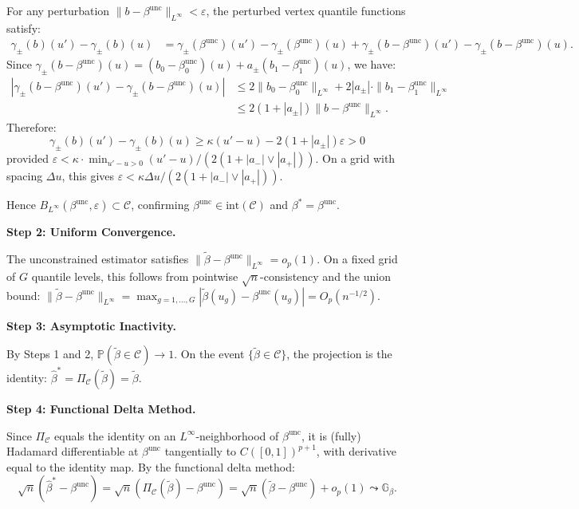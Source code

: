 \documentclass[12pt]{article}
\newcommand{\Prob}{\mathbb{P}}
\begin{document}
For any perturbation $\|b - \beta^{\text{unc}}\|_{L^\infty} < \varepsilon$, the perturbed vertex quantile functions satisfy:
\begin{align}
\gamma_\pm(b)(u') - \gamma_\pm(b)(u) &= \gamma_\pm(\beta^{\text{unc}})(u') - \gamma_\pm(\beta^{\text{unc}})(u) + \gamma_\pm(b-\beta^{\text{unc}})(u') - \gamma_\pm(b-\beta^{\text{unc}})(u).
\end{align}
Since $\gamma_\pm(b - \beta^{\text{unc}})(u) = (b_0 - \beta_0^{\text{unc}})(u) + a_\pm (b_1 - \beta_1^{\text{unc}})(u)$, we have:
\begin{align}
|\gamma_\pm(b-\beta^{\text{unc}})(u') - \gamma_\pm(b-\beta^{\text{unc}})(u)| &\leq 2\|b_0 - \beta_0^{\text{unc}}\|_{L^\infty} + 2|a_\pm| \cdot \|b_1 - \beta_1^{\text{unc}}\|_{L^\infty} \\
&\leq 2(1 + |a_\pm|) \|b - \beta^{\text{unc}}\|_{L^\infty}.
\end{align}
Therefore:
\[
\gamma_\pm(b)(u') - \gamma_\pm(b)(u) \geq \kappa(u'-u) - 2(1 + |a_\pm|)\varepsilon > 0
\]
provided $\varepsilon < \kappa \cdot \min_{u'-u > 0}(u'-u) / (2(1 + |a_-| \vee |a_+|))$. On a grid with spacing $\Delta u$, this gives $\varepsilon < \kappa \Delta u / (2(1 + |a_-| \vee |a_+|))$.

Hence $B_{L^\infty}(\beta^{\text{unc}}, \varepsilon) \subset \mathcal{C}$, confirming $\beta^{\text{unc}} \in \text{int}(\mathcal{C})$ and $\beta^* = \beta^{\text{unc}}$.

\textbf{Step 2: Uniform Convergence.}

The unconstrained estimator satisfies $\|\tilde{\beta} - \beta^{\text{unc}}\|_{L^\infty} = o_p(1)$. On a fixed grid of $G$ quantile levels, this follows from pointwise $\sqrt{n}$-consistency and the union bound: $\|\tilde{\beta} - \beta^{\text{unc}}\|_{L^\infty} = \max_{g=1,\dots,G} |\tilde{\beta}(u_g) - \beta^{\text{unc}}(u_g)| = O_p(n^{-1/2})$.

\textbf{Step 3: Asymptotic Inactivity.}

By Steps 1 and 2, $\Prob(\tilde{\beta} \in \mathcal{C}) \to 1$. On the event $\{\tilde{\beta} \in \mathcal{C}\}$, the projection is the identity: $\hat{\beta}^* = \Pi_{\mathcal{C}}(\tilde{\beta}) = \tilde{\beta}$.

\textbf{Step 4: Functional Delta Method.}

Since $\Pi_{\mathcal{C}}$ equals the identity on an $L^\infty$-neighborhood of $\beta^{\text{unc}}$, it is (fully) Hadamard differentiable at $\beta^{\text{unc}}$ tangentially to $C([0,1])^{p+1}$, with derivative equal to the identity map. By the functional delta method:
\[
\sqrt{n}(\hat{\beta}^* - \beta^{\text{unc}}) = \sqrt{n}(\Pi_{\mathcal{C}}(\tilde{\beta}) - \beta^{\text{unc}}) = \sqrt{n}(\tilde{\beta} - \beta^{\text{unc}}) + o_p(1) \leadsto \mathbb{G}_\beta.
\]
\end{document}
